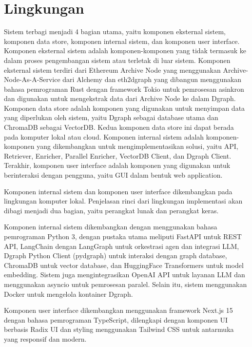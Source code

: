 \section{Lingkungan}
Sistem terbagi menjadi 4 bagian utama, yaitu komponen eksternal sistem, komponen data store, komponen internal sistem, dan komponen user interface. Komponen eksternal sistem adalah komponen-komponen yang tidak termasuk ke dalam proses pengembangan sistem atau terletak di luar sistem. Komponen eksternal sistem terdiri dari Ethereum Archive Node yang menggunakan Archive-Node-As-A-Service dari Alchemy dan eth2dgraph yang dibangun menggunakan bahasa pemrograman Rust dengan framework Tokio untuk pemrosesan asinkron dan digunakan untuk mengekstrak data dari Archive Node ke dalam Dgraph. Komponen data store adalah komponen yang digunakan untuk menyimpan data yang diperlukan oleh sistem, yaitu Dgraph sebagai database utama dan ChromaDB sebagai VectorDB. Kedua komponen data store ini dapat berada pada komputer lokal atau cloud. Komponen internal sistem adalah komponen-komponen yang dikembangkan untuk mengimplementasikan solusi, yaitu API, Retriever, Enricher, Parallel Enricher, VectorDB Client, dan Dgraph Client. Terakhir, komponen user interface adalah komponen yang digunakan untuk berinteraksi dengan pengguna, yaitu GUI dalam bentuk web application.

Komponen internal sistem dan komponen user interface dikembangkan pada lingkungan komputer lokal. Penjelasan rinci dari lingkungan implementasi akan dibagi menjadi dua bagian, yaitu perangkat lunak dan perangkat keras.

Komponen internal sistem dikembangkan dengan menggunakan bahasa pemrograman Python 3, dengan pustaka utama meliputi FastAPI untuk REST API, LangChain dengan LangGraph untuk orkestrasi agen dan integrasi LLM, Dgraph Python Client (pydgraph) untuk interaksi dengan graph database, ChromaDB untuk vector database, dan HuggingFace Transformers untuk model embedding. Sistem juga mengintegrasikan OpenAI API untuk layanan LLM dan menggunakan asyncio untuk pemrosesan paralel. Selain itu, sistem menggunakan Docker untuk mengelola kontainer Dgraph.

Komponen user interface dikembangkan menggunakan framework Next.js 15 dengan bahasa pemrograman TypeScript, dilengkapi dengan komponen UI berbasis Radix UI dan styling menggunakan Tailwind CSS untuk antarmuka yang responsif dan modern.

